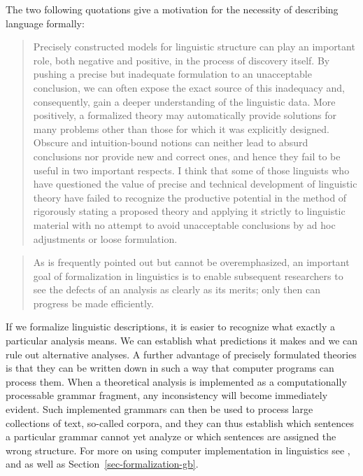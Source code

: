 The two following quotations give a motivation for the necessity of
describing language formally:  
\begin{quote}
\label{quote-Chomsky-Formalisierung}%
Precisely constructed models for linguistic structure can play an
important role, both negative and positive, in the process of discovery 
itself. By pushing a precise but inadequate formulation to
an unacceptable conclusion, we can often expose the exact source
of this inadequacy and, consequently, gain a deeper understanding
of the linguistic data. More positively, a formalized theory may 
automatically provide solutions for many problems other than those
for which it was explicitly designed. Obscure and intuition-bound
notions can neither lead to absurd conclusions nor provide new and
correct ones, and hence they fail to be useful in two important respects. 
I think that some of those linguists who have questioned
the value of precise and technical development of linguistic theory
have failed to recognize the productive potential in the method
of rigorously stating a proposed theory and applying it strictly to
linguistic material with no attempt to avoid unacceptable conclusions 
by ad hoc adjustments or loose formulation.
\citep[]{Chomsky57a}
\end{quote}

\begin{quote}
As is frequently pointed out but cannot be overemphasized, an important goal
of formalization in linguistics is to enable subsequent researchers to see the defects
of an analysis as clearly as its merits; only then can progress be made efficiently.
\citep[]{Dowty79a}
\end{quote}
%
If we formalize linguistic descriptions, it is easier to recognize what exactly a particular analysis means. 
We can establish what predictions it makes and we can rule out alternative analyses. A further
advantage of precisely formulated theories is that they can be written down in such a way
that computer programs can process them. When a theoretical analysis is implemented as a computationally processable grammar fragment, 
any inconsistency will become immediately evident. Such implemented grammars can then be used to process
large collections of text, so-called corpora, and they can thus establish which
sentences a particular grammar cannot yet analyze or which sentences are assigned the wrong
structure. For more on using computer implementation in linguistics see ,
 and  as well as Section~\ref{sec-formalization-gb}.



